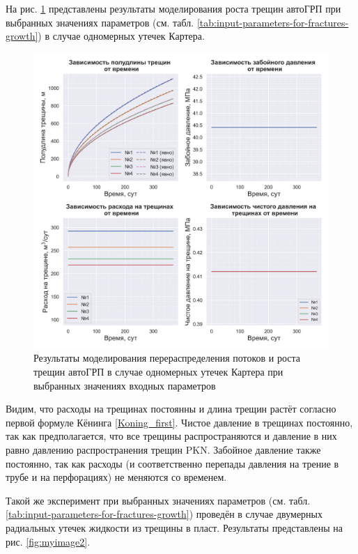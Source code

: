 На рис. \ref{fig:myimage1} представлены результаты моделирования роста трещин автоГРП при выбранных значениях параметров (см. табл. \ref{tab:input-parameters-for-fractures-growth}) в случае одномерных утечек Картера.

\begin{figure}[H] 
\center
\includegraphics[width=\linewidth]{images/myimage1.jpg}
\caption{Результаты моделирования перераспределения потоков и роста трещин автоГРП в случае одномерных утечек Картера при выбранных значениях входных параметров}
\label{fig:myimage1}
\end{figure}

Видим, что расходы на трещинах постоянны и длина трещин растёт согласно первой формуле Кёнинга \eqref{Koning_first}.
Чистое давление в трещинах постоянно, так как предполагается, что все трещины распространяются и давление в них равно давлению распространения трещин PKN.
Забойное давление также постоянно, так как расходы (и соответственно перепады давления на трение в трубе и на перфорациях) не меняются со временем.

Такой же эксперимент при выбранных значениях параметров (см. табл. \ref{tab:input-parameters-for-fractures-growth}) проведён в случае двумерных радиальных утечек жидкости из трещины в пласт.
Результаты представлены на рис. \ref{fig:myimage2}.

